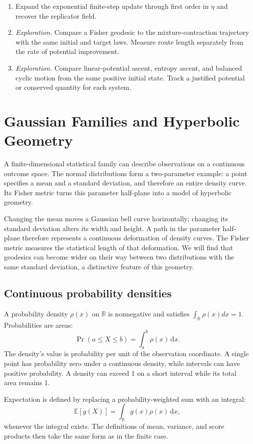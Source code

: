 \documentclass[11pt,oneside,openany]{book}
\theoremstyle{definition}
\theoremstyle{remark}
\newenvironment{exercises}{\begin{enumerate}[label=\thechapter.\arabic*,ref=\thechapter.\arabic*,leftmargin=2.8em,itemsep=6pt]}{\end{enumerate}}
\newcommand{\R}{\mathbb{R}}
\newcommand{\E}{\mathbb{E}}
\newcommand{\dd}{\,\mathrm{d}}
\numberwithin{equation}{chapter}
\begin{document}
\begin{exercises}
\item Expand the exponential finite-step update through first order in $\eta$ and recover the replicator field.
\item \emph{Exploration.} Compare a Fisher geodesic to the mixture-contraction trajectory with the same initial and target laws. Measure route length separately from the rate of potential improvement.
\item \emph{Exploration.} Compare linear-potential ascent, entropy ascent, and balanced cyclic motion from the same positive initial state. Track a justified potential or conserved quantity for each system.
\end{exercises}

\chapter{Gaussian Families and Hyperbolic Geometry}
\label{ch:gaussian}

A finite-dimensional statistical family can describe observations on a continuous outcome space. The normal distributions form a two-parameter example: a point specifies a mean and a standard deviation, and therefore an entire density curve. Its Fisher metric turns this parameter half-plane into a model of hyperbolic geometry.

Changing the mean moves a Gaussian bell curve horizontally; changing its standard deviation alters its width and height. A path in the parameter half-plane therefore represents a continuous deformation of density curves. The Fisher metric measures the statistical length of that deformation. We will find that geodesics can become wider on their way between two distributions with the same standard deviation, a distinctive feature of this geometry.

\section{Continuous probability densities}
A probability density $\rho(x)$ on $\R$ is nonnegative and satisfies $\int_{\R}\rho(x)dx=1$. Probabilities are areas:
\[
\Pr(a\leq X\leq b)=\int_a^b\rho(x)\dd x.
\]
The density's value is probability per unit of the observation coordinate. A single point has probability zero under a continuous density, while intervals can have positive probability. A density can exceed 1 on a short interval while its total area remains 1.

Expectation is defined by replacing a probability-weighted sum with an integral:
\[
\E[g(X)]=\int_{\R}g(x)\rho(x)\dd x,
\]
whenever the integral exists. The definitions of mean, variance, and score products then take the same form as in the finite case.
\end{document}
